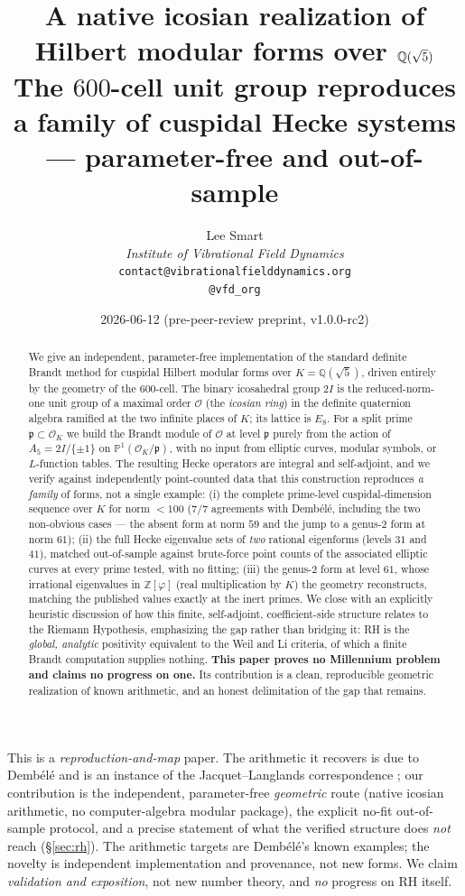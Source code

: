 \documentclass[11pt,a4paper]{article}
\title{\textbf{A native icosian realization of Hilbert modular forms
over $\Q(\sqrt5)$}\\[0.4em]
\large The $600$-cell unit group reproduces a family of cuspidal Hecke
systems --- parameter-free and out-of-sample}
\author{%
  Lee Smart\\[4pt]
  \textit{Institute of Vibrational Field Dynamics}\\[2pt]
  \texttt{contact@vibrationalfielddynamics.org}\\[2pt]
  \texttt{@vfd\_org}%
}
\date{2026-06-12 \quad (pre-peer-review preprint, v1.0.0-rc2)}
\newcommand{\Q}{\mathbb{Q}}
\newcommand{\Z}{\mathbb{Z}}
\newcommand{\PP}{\mathbb{P}}
\newcommand{\Ord}{\mathcal{O}}
\newcommand{\fp}{\mathfrak{p}}
\newcommand{\OK}{\Ord_K}
\begin{document}
\maketitle

\begin{abstract}
\noindent
We give an independent, parameter-free implementation of the standard
definite Brandt method for cuspidal Hilbert modular forms over
$K=\Q(\sqrt5)$, driven entirely by the geometry of the $600$-cell. The
binary icosahedral group $2I$ is the reduced-norm-one unit group of a
maximal order $\Ord$ (the \emph{icosian ring}) in the definite
quaternion algebra ramified at the two infinite places of $K$; its
lattice is $E_8$. For a split prime $\fp\subset\OK$ we build the Brandt
module of $\Ord$ at level $\fp$ purely from the action of
$A_5=2I/\{\pm1\}$ on $\PP^1(\OK/\fp)$, with no input from elliptic
curves, modular symbols, or $L$-function tables. The resulting Hecke
operators are integral and self-adjoint, and we verify against
independently point-counted data that this construction reproduces
\emph{a family} of forms, not a single example:
(i) the complete prime-level cuspidal-dimension sequence over $K$ for
norm ${<}100$ ($7/7$ agreements with Demb\'el\'e, including the two
non-obvious cases --- the absent form at norm $59$ and the jump to a
genus-$2$ form at norm $61$);
(ii) the full Hecke eigenvalue sets of \emph{two} rational eigenforms
(levels $31$ and $41$), matched out-of-sample against brute-force point
counts of the associated elliptic curves at every prime tested, with no
fitting;
(iii) the genus-$2$ form at level $61$, whose irrational eigenvalues in
$\Z[\varphi]$ (real multiplication by $K$) the geometry reconstructs,
matching the published values exactly at the inert primes.
We close with an explicitly heuristic discussion of how this finite,
self-adjoint, coefficient-side structure relates to the Riemann
Hypothesis, emphasizing the gap rather than bridging it: RH is the
\emph{global, analytic} positivity equivalent to the Weil and Li
criteria, of which a finite Brandt computation supplies nothing.
\textbf{This paper proves no Millennium problem and claims no progress
on one.} Its contribution is a clean, reproducible geometric realization
of known arithmetic, and an honest delimitation of the gap that remains.
\end{abstract}

\begin{scopebox}
This is a \emph{reproduction-and-map} paper. The arithmetic it recovers
is due to Demb\'el\'e \cite{Dembele2005} and is an instance of the
Jacquet--Langlands correspondence \cite{JacquetLanglands1970,
Eichler1973}; our contribution is the independent, parameter-free
\emph{geometric} route (native icosian arithmetic, no computer-algebra
modular package), the explicit no-fit out-of-sample protocol, and a
precise statement of what the verified structure does \emph{not} reach
(\S\ref{sec:rh}). The arithmetic targets are Demb\'el\'e's known
examples; the novelty is independent implementation and provenance,
not new forms. We claim \emph{validation and exposition}, not new
number theory, and \emph{no} progress on RH itself.
\end{scopebox}
\end{document}
